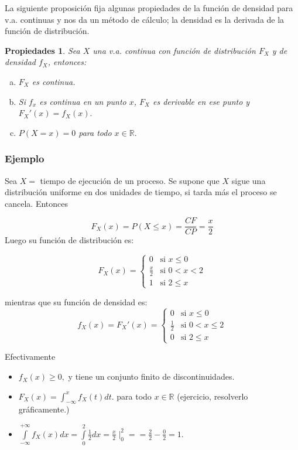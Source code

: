\documentclass[handout]{beamer}\usepackage[]{graphicx}\usepackage[]{color}
\newcommand{\RR}{\mathbb{R}}
\renewcommand{\leq}{\leqslant}
\renewcommand{\geq}{\geqslant}
\theoremstyle{plain}
\newtheorem{prop}{Propiedades}
\theoremstyle{definition}
\begin{document}
\begin{frame}
La siguiente proposición fija algunas propiedades de la función de densidad para v.a.
continuas y nos da un método de cálculo; la densidad es la derivada de la función de
distribución.

\begin{prop}

Sea $X$ una v.a. continua con función de distribución $F_X$ y de densidad $f_X$, entonces:

\begin{enumerate}[a)]
\item $F_X$ es continua.
\item Si $f_x$ es continua en un punto $x$, $F_X$ es derivable en ese punto y
$F_X'(x)=f_X(x).$
\item $P(X=x)=0$ para todo $x\in\RR.$
\end{enumerate}
\end{prop}
\end{frame}



\begin{frame}
\frametitle{Ejemplo}
Sea $X=$ tiempo de ejecución de un proceso. Se supone que $X$
sigue una distribución uniforme en dos unidades de tiempo,
si tarda más el proceso se cancela. Entonces

$$F_{X}(x)=P(X\leq x)=\frac{CF}{CP}=\frac{x}{2}$$
Luego su función de distribución es:



$$F_{X}(x)=\left\{\begin{array}{ll}
0 & \mbox{si } x\leq 0\\
\frac{x}{2} & \mbox{si } 0<x<2\\
1 & \mbox{si } 2\leq x
\end{array}\right.$$
\end{frame}

\begin{frame}
mientras que su función de densidad es:
$$f_{X}(x)=F_{X}'(x)=\left\{\begin{array}{ll}
0 & \mbox{si } x\leq 0\\
\frac{1}{2} & \mbox{si } 0<x\leq 2\\
0 & \mbox{si } 2\leq x
\end{array}\right.$$

Efectivamente
\begin{itemize}
\item $f_{X}(x)\geq 0,$ y tiene un conjunto finito de discontinuidades.
\item $F_X(x)=\int_{-\infty}^x f_X(t) dt.$ para todo $x\in \RR$ (ejercicio,
resolverlo gráficamente.)
\item $\int\limits_{-\infty}^{+\infty}f_{X}(x)dx=
\int\limits_{0}^{2}\frac{1}{2}dx=\frac{x}{2}\mid_{0}^{2}=
=\frac{2}{2}-\frac{0}{2}=1.$
\end{itemize}
\end{frame}
\end{document}
